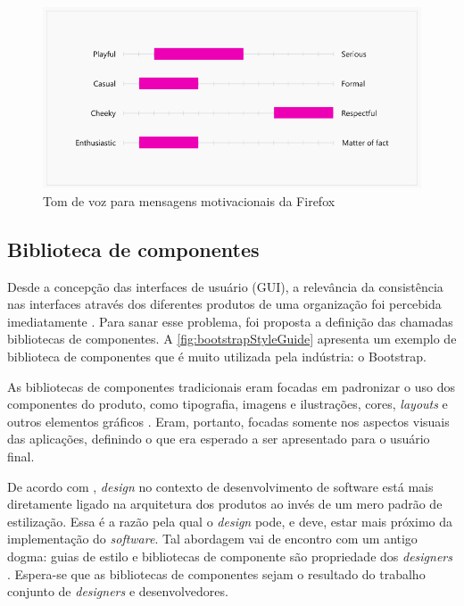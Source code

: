 \begin{figure}
	\includegraphics[width=\linewidth]{./04-figuras/02_referencial_teorico/firefox-tone-voice-02.png}
	\caption{Tom de voz para mensagens motivacionais da Firefox}
  \label{fig:firefoxVoiceTonePlayful}
\end{figure}

\subsection{Biblioteca de componentes}
\label{sec:bibliotecaComponentes}

Desde a concepção das interfaces de usuário (GUI), a relevância da consistência nas interfaces através dos diferentes produtos de uma organização foi percebida imediatamente \cite{ruissalo2018operating}. Para sanar esse problema, foi proposta a definição das chamadas bibliotecas de componentes. A \autoref{fig:bootstrapStyleGuide} apresenta um exemplo de biblioteca de componentes que é muito utilizada pela indústria: o Bootstrap.

As bibliotecas de componentes tradicionais eram focadas em padronizar o uso dos componentes do produto, como tipografia, imagens e ilustrações, cores, \textit{layouts} e outros elementos gráficos \cite{ruissalo2018operating}. Eram, portanto, focadas somente nos aspectos visuais das aplicações, definindo o que era esperado a ser apresentado para o usuário final.

De acordo com \cite{taylor2007software}, \textit{design} no contexto de desenvolvimento de software está mais diretamente ligado na arquitetura dos produtos ao invés de um mero padrão de estilização. Essa é a razão pela qual o \textit{design} pode, e deve, estar mais próximo da implementação do \textit{software}. Tal abordagem vai de encontro com um antigo dogma: guias de estilo e bibliotecas de componente são propriedade dos \textit{designers} \cite{ruissalo2018operating}. Espera-se que as bibliotecas de componentes sejam o resultado do trabalho conjunto de \textit{designers} e desenvolvedores.

